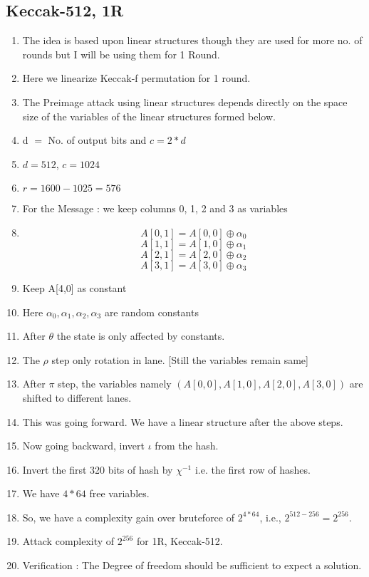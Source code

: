 \documentclass{article}
\begin{document}
\subsection{Keccak-512, 1R}
\begin{enumerate}
    \item The idea is based upon linear structures though they are used for more no. of rounds but I will be using them for 1 Round.
    \item Here we linearize Keccak-f permutation for 1 round.
    \item The Preimage attack using linear structures depends directly on the space size of the variables of the linear structures formed below.
    \item d $=$ No. of output bits and $c = 2*d$
    \item $d = 512$, $c = 1024$
    \item $r = 1600 - 1025 = 576$
    \item For the Message : we keep columns 0, 1, 2 and 3 as variables
    \item \[ A[0, 1] = A[0, 0] \oplus \alpha_0 \]
        \[ A[1, 1] = A[1, 0] \oplus \alpha_1 \]
         \[ A[2, 1] = A[2, 0] \oplus \alpha_2 \]
         \[ A[3, 1] = A[3, 0] \oplus \alpha_3 \]
    \item Keep A[4,0] as constant
    \item Here $\alpha_0, \alpha_1, \alpha_2, \alpha_3$ are random constants
    \item After $\theta$ the state is only affected by constants.
    \item The $\rho$ step only rotation in lane. [Still the variables remain same]
    \item After $\pi$ step, the variables namely $(A[0,0], A[1,0], A[2,0], A[3,0])$ are shifted to different lanes.
    \item This was going forward. We have a linear structure after the above steps.
    \item Now going backward, invert $\iota$ from the hash.
    \item Invert the first 320 bits of hash by $\chi^{-1}$ i.e. the first row of hashes.
    \item We have $4*64$ free variables.
    \item So, we have a complexity gain over bruteforce of $2^{4*64}$, i.e., $2^{512 - 256} = 2 ^{256}$.
    \item Attack complexity of $2^{256}$ for 1R, Keccak-512.
    \item Verification : The Degree of freedom should be sufficient to expect a solution.

\end{enumerate}
\end{document}

